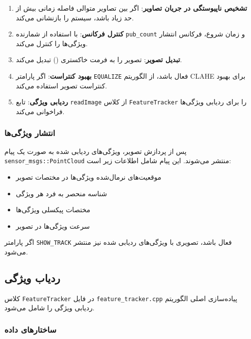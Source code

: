 \documentclass[11pt, a4paper]{article}
\begin{document}
	\begin{enumerate}
		\item \textbf{تشخیص ناپیوستگی در جریان تصاویر}: اگر بین تصاویر متوالی فاصله زمانی بیش از حد زیاد باشد، سیستم را بازنشانی می‌کند.
		\item \textbf{کنترل فرکانس}: با استفاده از شمارنده \texttt{pub\_count} و زمان شروع، فرکانس انتشار ویژگی‌ها را کنترل می‌کند.
		\item \textbf{تبدیل تصویر}: تصویر را به فرمت خاکستری () تبدیل می‌کند.
		\item \textbf{بهبود کنتراست}: اگر پارامتر \texttt{EQUALIZE} فعال باشد، از الگوریتم CLAHE برای بهبود کنتراست تصویر استفاده می‌کند.
		\item \textbf{ردیابی ویژگی}: تابع \texttt{readImage} از کلاس \texttt{FeatureTracker} را برای ردیابی ویژگی‌ها فراخوانی می‌کند.
	\end{enumerate}
	
	\subsubsection{انتشار ویژگی‌ها}
	\label{subsubsec:feature_publishing}
	
	پس از پردازش تصویر، ویژگی‌های ردیابی شده به صورت یک پیام \texttt{sensor\_msgs::PointCloud} منتشر می‌شوند. این پیام شامل اطلاعات زیر است:
	
	\begin{itemize}
		\item موقعیت‌های نرمال‌شده ویژگی‌ها در مختصات تصویر
		\item شناسه منحصر به فرد هر ویژگی
		\item مختصات پیکسلی ویژگی‌ها
		\item سرعت ویژگی‌ها در تصویر
	\end{itemize}
	
	اگر پارامتر \texttt{SHOW\_TRACK} فعال باشد، تصویری با ویژگی‌های ردیابی شده نیز منتشر می‌شود.
	
	\subsection{ ردیاب ویژگی}
	\label{subsec:feature_tracker_core}
	
	کلاس \texttt{FeatureTracker} در فایل \texttt{feature\_tracker.cpp} پیاده‌سازی اصلی الگوریتم ردیابی ویژگی را شامل می‌شود.
	
	\subsubsection{ساختارهای داده}
	\label{subsubsec:data_structures}
	
\end{document}
